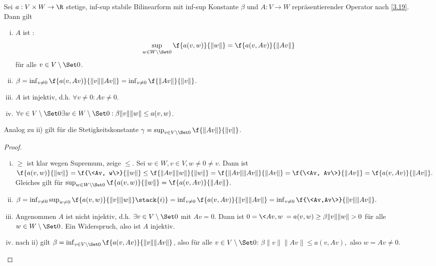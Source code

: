 \begin{st} \label{3.32}
	Sei $a: V \times W \to \R$ stetige, inf-sup stabile Bilinearform mit inf-sup Konstante $\beta$ und $A: V \to W$ repräsentierender Operator nach \ref{3.19}.
	Dann gilt
	\begin{enumerate}[i)]
		\item
			$A$ ist :
			\[
				\sup_{w \in W\setminus \Set 0} \f{a(v,w)}{\|w\|}
				= \f{a(v,Av)}{\|Av\|}
			\]
			für alle $v \in V \setminus \Set 0$.
		\item
			$\beta = \inf_{v \neq 0} \f {a(v,Av)}{\|v\| \|Av\|} = \inf_{v \neq 0} \f{\|Av\|}{\|v\|}$.
		\item
			$A$ ist injektiv, d.h. $\forall v \neq 0 : Av \neq 0$.
		\item
			$\forall v \in V \setminus \Set 0 \exists w \in W \setminus \Set 0 : \beta \|v\|\|w\| \le a(v,w)$.
	\end{enumerate}
	\begin{note}
		Analog zu ii) gilt für die Stetigkeitskonstante $\gamma = \sup_{v \in V \setminus \Set 0} \f{\|Av\|}{\|v\|}$.
	\end{note}
	\begin{proof}
		\begin{enumerate}[i)]
			\item
				$\ge$ ist klar wegen Supremum, zeige $\le$.
				Sei $w \in W, v \in V, w \neq 0 \neq v$.
				Dann ist
				\begin{math}
					\f {a(v,w)}{\|w\|}
					= \f{\<Av, w\>}{\|w\|}
					\le \f{\|Av\|\|w\|}{\|w\|}
					= \f{\|Av\|\|Av\|}{\|Av\|}
					= \f{\<Av, Av\>}{\|Av\|}
					= \f{a(v,Av)}{\|Av\|}.
				\end{math}
				Gleiches gilt für $\sup_{w\in W\setminus \Set 0} \f{a(v,w)}{\|w\|} = \f {a(v,Av)}{\|Av\|}$.
			\item
				\begin{math}
					\beta
					= \inf_{v\neq 0} \sup_{w\neq 0} \f{a(v,w)}{\|v\|\|w\|}
					\stack{i)}= \inf_{v\neq 0} \f{a(v,Av)}{\|v\|\|Av\|}
					= \inf_{v\neq 0} \f{\<Av,Av\>}{\|v\|\|Av\|}.
				\end{math}
			\item
				Angenommen $A$ ist nicht injektiv, d.h. $\exists v \in V \setminus \Set 0$ mit $Av = 0$.
				Dann ist
				\begin{math}
					0
					= \<Av, w\>
					= a(v,w)
					\ge \beta \|v\|\|w\|
					> 0
				\end{math}
				für alle $w \in W \setminus \Set 0$.
				Ein Widerspruch, also ist $A$ injektiv.
			\item
				nach ii) gilt $\beta = \inf_{v\in V \setminus \Set 0} \f{a(v,Av)}{\|v\|\|Av\|}$, also für alle $v \in V \setminus \Set 0$:
				\begin{math}
					\beta \|v\|\|Av\| \le a(v,Av),
				\end{math}
				also $w = Av \neq 0$.
		\end{enumerate}
	\end{proof}
\end{st}

